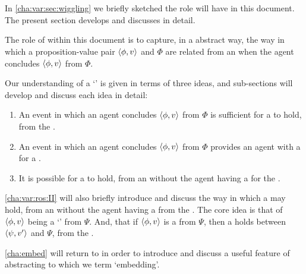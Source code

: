 \section{}
\label{cha:var:ros}

\begin{note}
  In \autoref{cha:var:sec:wiggling} we briefly sketched the role  will have in this document.
  The present section develops and discusses  in detail.

  The role of  within this document is to capture, in a abstract way, the way in which a proposition-value pair \(\langle \phi, v \rangle\) and \poP{} \(\Phi\) are related from an \agpe{} when the agent concludes \(\langle \phi, v \rangle\) from \(\Phi\).
\end{note}

\begin{note}
  Our understanding of a `' is given in terms of three ideas, and sub-sections will develop and discuss each idea in detail:

  \begin{enumerate}[label=, leftmargin=*]
  \item

    An event in which an agent concludes \(\langle \phi, v \rangle\) from \(\Phi\) is sufficient for a \ros{} to hold, from the \agpe{}.
  \item

    An event in which an agent concludes \(\langle \phi, v \rangle\) from \(\Phi\) provides an agent with a  for a \ros{}.
  \item

    It is possible for a \ros{} to hold, from an \agpe{} without the agent having a \wit{} for the \ros{}.
  \end{enumerate}

  \autoref{cha:var:ros:II} will also briefly introduce and discuss the way in which a \ros{} may hold, from an \agpe{} without the agent having a \wit{} from the \ros{}.
  The core idea is that of \(\langle \phi, v \rangle\) being a `' from \(\Psi\).
  And, that if \(\langle \phi, v \rangle\) is a  from \(\Psi\), then a  holds between \(\langle \psi, v' \rangle\) and \(\Psi\), from the \agpe{}.

  \autoref{cha:embed} will return to \ros{} in order to introduce and discuss a useful feature of abstracting to  which we term `embedding'.
\end{note}

